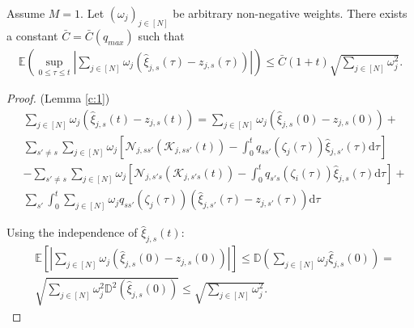 \documentclass[10pt,a4paper]{amsart}
\newcommand{\E}{\mathbb{E}}
\renewcommand{\d}{\mathrm{d}}
\begin{document}
	\begin{lemma}
		\label{c:1}
		Assume $M=1$. Let $\left( \omega_j \right)_{j\in [N]}$ be arbitrary non-negative weights. There exists a constant $\bar{C}=\bar{C}(q_{max})$ such that
		\begin{align*}
			\E \left( \sup_{0 \leq  \tau \leq t} \left | \sum_{j \in [N]} \omega_j \left(\hat{\xi}_{j,s}(\tau)-z_{j,s}(\tau) \right) \right|\right) \leq \bar{C}(1+t)\sqrt{\sum_{j \in [N]} \omega_j^2}.
		\end{align*}
	\end{lemma}

	\begin{proof} (Lemma \ref{c:1})
		\begin{align*}
			&\sum_{j \in [N]} \omega_j \left(\hat{\xi}_{j,s}(t)-z_{j,s}(t) \right)=\sum_{j \in [N]} \omega_j \left(\hat{\xi}_{j,s}(0)-z_{j,s}(0) \right) + \\
			&\sum_{s' \neq s}\sum_{j \in [N]}\omega_j \left[ \mathcal{N}_{j,ss'}\left(\mathcal{K}_{j,ss'}(t) \right) -\int_{0}^{t}q_{ss'} \left( \zeta_{j}(\tau)\right) \hat{\xi}_{j,s'}(\tau) \d \tau \right] \\
			&-\sum_{s' \neq s} \sum_{j \in [N]}\omega_j \left[ \mathcal{N}_{j,s's}\left(\mathcal{K}_{j,s's}(t) \right) -\int_{0}^{t}q_{s's} \left( \zeta_{i}(\tau)\right) \hat{\xi}_{j,s}(\tau) \d \tau \right]+ \\
			&\sum_{s'} \int_{0}^{t} \sum_{j \in [N]}\omega_j q_{ss'}(\zeta_j(\tau)) \left(\hat{\xi}_{j,s'}(\tau)-z_{j,s'}(\tau) \right) \d \tau
		\end{align*}
		
		Using the independence of $\hat{\xi}_{j,s}(t)$:
		\begin{align*}
			&\E \left[ \left| \sum_{j \in [N]} \omega_j \left(\hat{\xi}_{j,s}(0)-z_{j,s}(0) \right)\right| \right] \leq \mathbb{D} \left(\sum_{j \in [N]} \omega_j \hat{\xi}_{j,s}(0) \right)= \\
			&\sqrt{\sum_{j \in [N]}\omega_j^2\mathbb{D}^2 \left(\hat{\xi}_{j,s}(0) \right)} \leq \sqrt{\sum_{j \in [N]}\omega_j^2}.
		\end{align*}		
		

\end{proof}
\end{document}
